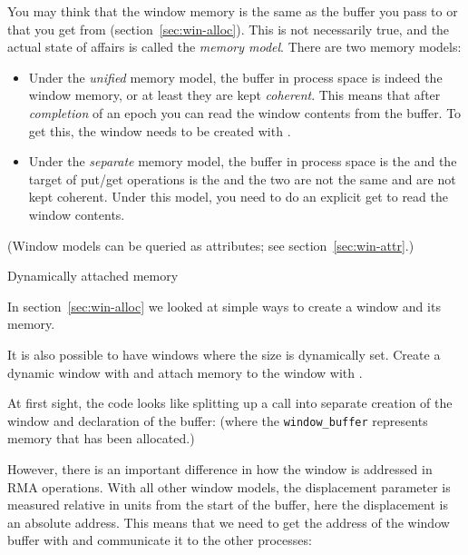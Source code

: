 You may think that the window memory is the same as the buffer you
pass to  or that you get from
 (section~\ref{sec:win-alloc}).
This is not necessarily true, and the
actual state of affairs is called the
\emph{memory model}. There are two memory models:
\begin{itemize}
\item Under the \emph{unified} memory
  model, the buffer in process space is indeed the window memory,
  or at least they are kept \emph{coherent}.
  This
  means that after \emph{completion} of an
  epoch you can read the window contents from the buffer.
  To get this, the window needs to be created with
  .
\item Under the \emph{separate} memory
  model, the buffer in process space is the
   and the target of put/get operations
  is the  and the two are not the same
  and are not kept coherent. Under this model, you need to do an
  explicit get to read the window contents.
\end{itemize}
(Window models can be queried as attributes; see section~\ref{sec:win-attr}.)

 {Dynamically attached memory}
\label{sec:win-dynamic}

In section~\ref{sec:win-alloc} we looked at simple ways to create a
window and its memory.

It is also possible to have windows where the size is dynamically set.
Create a dynamic window with
and attach
memory to the window with
%
.

At first sight, the code looks like splitting up a 
call into separate creation of the window and declaration of the buffer:
%
(where the \lstinline{window_buffer} represents memory that has been allocated.)

However, there is an important difference in how the window is addressed
in \ac{RMA} operations.
With all other window models, the displacement parameter is measured relative
in units from the start of the buffer, here the displacement
is an absolute address. This means that we need to get the address
of the window buffer with  and
communicate it to the other processes:
%

